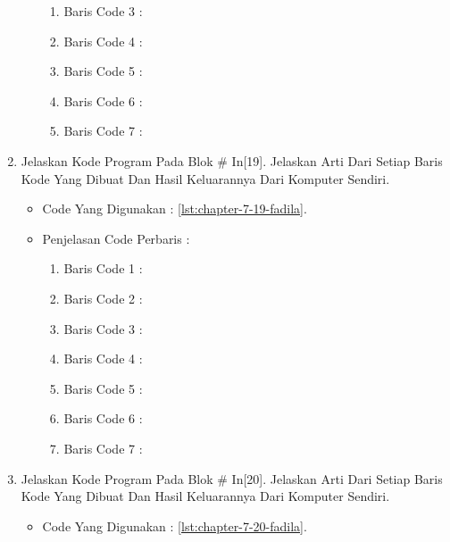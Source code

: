 \begin{enumerate}
\begin{itemize}
\begin{enumerate}
\item Baris Code 3	:
\item Baris Code 4	:
\item Baris Code 5	:
\item Baris Code 6	:
\item Baris Code 7	:
\end{enumerate}
\par
\par
\end{itemize}
\par
\par
\par
\item Jelaskan Kode Program Pada Blok \# In[19]. Jelaskan Arti Dari Setiap Baris Kode Yang Dibuat Dan Hasil Keluarannya Dari Komputer Sendiri.
\begin{itemize}
\item Code Yang Digunakan : \ref{lst:chapter-7-19-fadila}.

\par
\par
\item Penjelasan Code Perbaris	: 
\begin{enumerate}
\item Baris Code 1	:
\item Baris Code 2	:
\item Baris Code 3	:
\item Baris Code 4	:
\item Baris Code 5	:
\item Baris Code 6	:
\item Baris Code 7	:
\end{enumerate}
\par
\par
\end{itemize}
\par
\par
\par
\item Jelaskan Kode Program Pada Blok \# In[20]. Jelaskan Arti Dari Setiap Baris Kode Yang Dibuat Dan Hasil Keluarannya Dari Komputer Sendiri.
\begin{itemize}
\item Code Yang Digunakan : \ref{lst:chapter-7-20-fadila}.


\end{itemize}
\end{enumerate}
